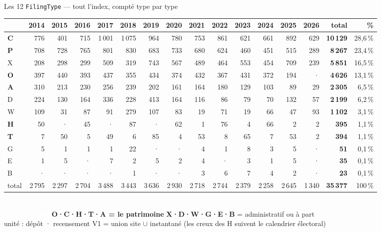 \documentclass[11pt,aspectratio=169]{beamer}
\newcommand{\badge}[2]{\colorbox{#1}{\textcolor{white}{\footnotesize\textbf{#2}}}}
\newcommand{\badgel}[2]{\colorbox{#1}{\textcolor{black!80}{\footnotesize\textbf{#2}}}}
\begin{document}
\begin{frame}{Les 12 \texttt{FilingType} — tout l'index, compté type par type}
  \centering
  {\setlength{\tabcolsep}{3pt}\scriptsize
  \begin{tabular}{l rrrrrrrrrrrrr r r}
    \toprule
    & 2014 & 2015 & 2016 & 2017 & 2018 & 2019 & 2020 & 2021 & 2022 & 2023 & 2024 & 2025 & 2026 & total & \% \\
    \midrule
    \textcolor{dataC}{\textbf{C}} & 776 & 401 & 715 & 1\,001 & 1\,075 & 964 & 780 & 753 & 861 & 621 & 661 & 892 & 629 & \textbf{10\,129} & 28,6\,\% \\
    \textcolor{helec}{\textbf{P}} & 708 & 728 & 765 & 801 & 830 & 683 & 733 & 680 & 624 & 460 & 451 & 515 & 289 & \textbf{8\,267} & 23,4\,\% \\
    \textcolor{black!45}{X} & 208 & 298 & 299 & 509 & 319 & 743 & 567 & 489 & 464 & 553 & 454 & 709 & 239 & \textbf{5\,851} & 16,5\,\% \\
    \textcolor{dataC}{\textbf{O}} & 397 & 440 & 393 & 437 & 355 & 434 & 374 & 432 & 367 & 431 & 372 & 194 & · & \textbf{4\,626} & 13,1\,\% \\
    \textcolor{dataC}{\textbf{A}} & 310 & 213 & 230 & 256 & 239 & 202 & 161 & 164 & 180 & 129 & 103 & 89 & 29 & \textbf{2\,305} & 6,5\,\% \\
    \textcolor{black!45}{D} & 224 & 130 & 164 & 336 & 228 & 413 & 164 & 116 & 86 & 79 & 70 & 132 & 57 & \textbf{2\,199} & 6,2\,\% \\
    \textcolor{black!45}{W} & 109 & 31 & 87 & 91 & 279 & 107 & 83 & 19 & 71 & 19 & 66 & 47 & 93 & \textbf{1\,102} & 3,1\,\% \\
    \textcolor{dataC}{\textbf{H}} & 50 & · & 45 & · & 87 & · & 62 & 1 & 76 & 4 & 66 & 2 & 2 & \textbf{395} & 1,1\,\% \\
    \textcolor{dataC}{\textbf{T}} & 7 & 50 & 5 & 49 & 6 & 85 & 4 & 53 & 8 & 65 & 7 & 53 & 2 & \textbf{394} & 1,1\,\% \\
    \textcolor{black!45}{G} & 5 & 1 & 1 & 1 & 22 & · & · & 4 & 1 & 8 & 3 & 5 & · & \textbf{51} & 0,1\,\% \\
    \textcolor{black!45}{E} & 1 & 5 & · & 7 & 2 & 5 & 2 & 4 & · & 3 & 1 & 5 & · & \textbf{35} & 0,1\,\% \\
    \textcolor{black!45}{B} & · & · & · & · & 1 & · & · & 3 & 6 & 7 & 4 & 2 & · & \textbf{23} & 0,1\,\% \\
    \midrule
    total & 2\,795 & 2\,297 & 2\,704 & 3\,488 & 3\,443 & 3\,636 & 2\,930 & 2\,718 & 2\,744 & 2\,379 & 2\,258 & 2\,645 & 1\,340 & \textbf{35\,377} & 100\,\% \\
    \bottomrule
  \end{tabular}}\\[1.8mm]
  {\footnotesize \badge{helec}{P = le signal}\;
   \badgel{dataC!30}{\textcolor{dataC}{\textbf{O·C·H·T·A} = le patrimoine}}\;
   {\color{black!50}\textbf{X·D·W·G·E·B} = administratif ou à part}}\\[0.8mm]
  {\scriptsize\color{black!55} unité : dépôt · recensement V1 = union site $\cup$
   instantané (les creux des H suivent le calendrier électoral)}
\end{frame}
\end{document}
